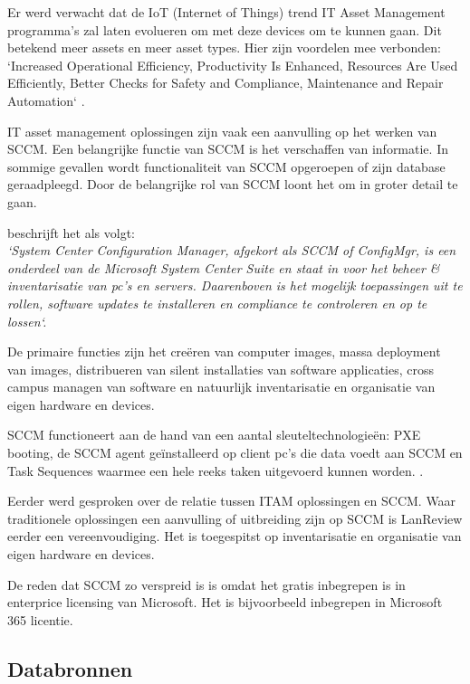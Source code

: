 Er werd verwacht dat de IoT (Internet of Things) trend IT Asset Management programma's zal laten evolueren om met deze devices om te kunnen gaan. Dit betekend meer assets en meer asset types. Hier zijn voordelen mee verbonden: `Increased Operational Efficiency, Productivity Is Enhanced, Resources Are Used Efficiently, Better Checks for Safety and Compliance, Maintenance and Repair Automation` \autocite{Badnakhe2020}.

IT asset management oplossingen zijn vaak een aanvulling op het werken van SCCM. Een belangrijke functie van SCCM is het verschaffen van informatie. In sommige gevallen wordt functionaliteit van SCCM opgeroepen of zijn database geraadpleegd. Door de belangrijke rol van SCCM loont het om in groter detail te gaan.

\textcite{Droogenbroot2016} beschrijft het als volgt:\\
\textit{`System Center Configuration Manager, afgekort als SCCM of ConfigMgr, is een onderdeel van de Microsoft System Center Suite en staat in voor het beheer \& inventarisatie van pc's en servers. Daarenboven is het mogelijk toepassingen uit te rollen, software updates te installeren en compliance te controleren en op te lossen`.}

De primaire functies zijn het creëren van computer images, massa deployment van images, distribueren van silent installaties van software applicaties, cross campus managen van software en natuurlijk inventarisatie en organisatie van eigen hardware en devices.

SCCM functioneert aan de hand van een aantal sleuteltechnologieën: PXE booting, de SCCM agent geïnstalleerd op client pc's die data voedt aan SCCM en Task Sequences waarmee een hele reeks taken uitgevoerd kunnen worden. \autocite{Spitze2019}.

Eerder werd gesproken over de relatie tussen ITAM oplossingen en SCCM. Waar traditionele oplossingen een aanvulling of uitbreiding zijn op SCCM is LanReview eerder een vereenvoudiging. Het is toegespitst op inventarisatie en organisatie van eigen hardware en devices.

De reden dat SCCM zo verspreid is is omdat het gratis inbegrepen is in enterprice licensing van Microsoft. Het is bijvoorbeeld inbegrepen in Microsoft 365 licentie. \autocite{MicrosoftDocs2020}

\subsection{Databronnen}

